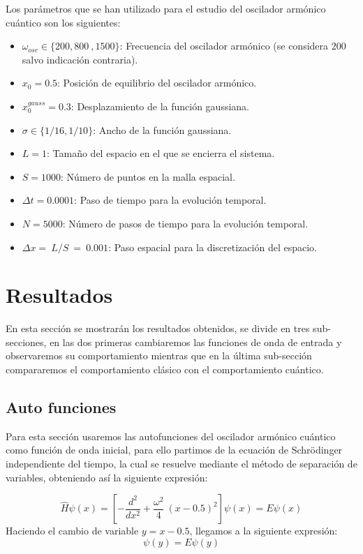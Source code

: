 \documentclass[10pt,onecolumn]{article}
\begin{document}
Los parámetros que se han utilizado para el estudio del oscilador armónico cuántico son los siguientes:
\begin{itemize}
    \item $\omega_{osc} \in \{200, 800\ ,1500\}$: Frecuencia del oscilador armónico (se considera $200$ salvo indicación contraria).
    \item $x_0 = 0.5$: Posición de equilibrio del oscilador armónico.
    \item $x_0^{gauss} = 0.3$: Desplazamiento de la función gaussiana.
    \item $\sigma \in \{1/16, 1/10\}$: Ancho de la función gaussiana.
    \item $L = 1$: Tamaño del espacio en el que se encierra el sistema.
    \item $S = 1000$: Número de puntos en la malla espacial.
    \item $\Delta t = 0.0001 $: Paso de tiempo para la evolución temporal.
    \item $N = 5000$: Número de pasos de tiempo para la evolución temporal.
    \item $\Delta x =\ L/S\ =\ 0.001$: Paso espacial para la discretización del espacio.
\end{itemize}




\section{Resultados}
En esta sección se mostrarán los resultados obtenidos, se divide en tres sub-secciones, en las dos primeras cambiaremos las funciones de onda de entrada y observaremos su comportamiento mientras que en la última sub-sección compararemos el comportamiento clásico con el comportamiento cuántico.

\subsection{Auto funciones}
\label{subsec:Autofunciones}
Para esta sección usaremos las autofunciones del oscilador armónico cuántico como función de onda inicial, para ello partimos de la ecuación de Schrödinger independiente del tiempo, la cual se resuelve mediante el método de separación de variables, obteniendo así la siguiente expresión:

\begin{equation}
    \hat{H}\psi(x) =[-\dfrac{d^2}{dx^2} + \dfrac{\omega^2}{4}\ (x-0.5)^2] \psi(x) = E\psi(x)
\end{equation}
Haciendo el cambio de variable $y = x - 0.5$, llegamos a la siguiente expresión:
\begin{equation}
    [-\dfrac{d^2}{dy^2} + \dfrac{\omega^2}{4}\ y^2] \psi(y) = E\psi(y)
\end{equation}
\end{document}
